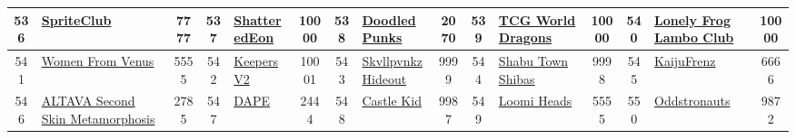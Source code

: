 \begin{table*}[]
{\begin{tabular}{|c|l|c|c|l|c|c|l|c|c|l|c|c|l|c|}
        536   & \href{https://spriteclubnft.com/}{SpriteClub}                                      & 7777              & 537   & \href{https://shatteredeon.io}{ShatteredEon}                                                      & 10000             & 538   & \href{https://www.punksdoodled.com/}{Doodled Punks}                               & 2070              & 539   & \href{https://tcg.world/}{TCG World Dragons}                                  & 10000             & 540   & \href{https://lonelyfroglambo.club/}{Lonely Frog Lambo Club}                              & 10000                                   \\ \hline
        541   & \href{https://www.womenfromvenus.io/}{Women From Venus}                            & 5555              & 542   & \href{http://kprverse.com}{Keepers V2}                                                            & 10001             & 543   & \href{https://skvllpvnkz.io}{Skvllpvnkz Hideout}                                  & 9999              & 544   & \href{http://shabu.town/}{Shabu Town Shibas}                                  & 9998              & 545   & \href{https://kaijufrenz.com/}{KaijuFrenz}                                                & 6666                                    \\ \hline
        546   & \href{https://secondskin.app}{ALTAVA Second Skin Metamorphosis}                    & 2785              & 547   & \href{https://www.dapenft.com/}{DAPE}                                                             & 2444              & 548   & \href{https://www.castlekidnft.com/}{Castle Kid}                                  & 9987              & 549   & \href{http://loomiheads.com}{Loomi Heads}                                     & 5555              & 550   & \href{http://www.oddstronauts.com}{Oddstronauts}                                          & 9872                                    \\ \hline
    

\end{tabular}}
\end{table*}
